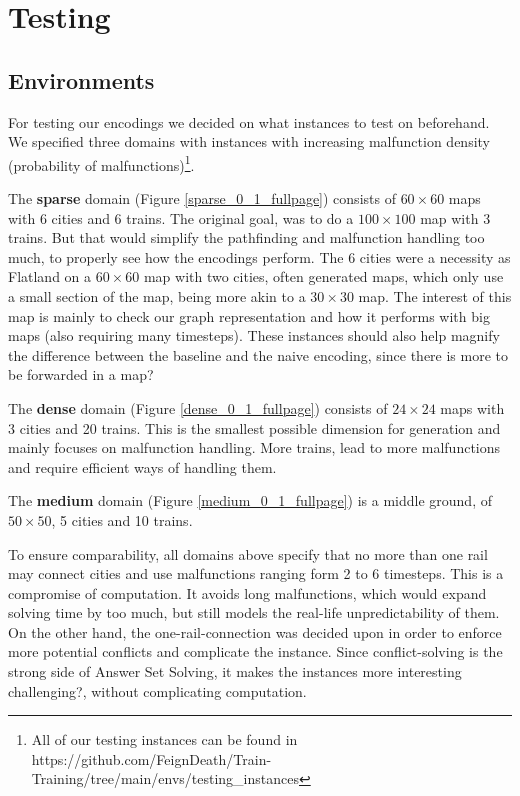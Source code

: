\section{Testing}
\subsection{Environments}
For testing our encodings we decided on what instances to test on beforehand. We specified three domains with instances with increasing malfunction density (probability of malfunctions)\footnote{All of our testing instances can be found in https://github.com/FeignDeath/Train-Training/tree/main/envs/testing\_instances}. 

The \textbf{sparse} domain (Figure \ref{sparse_0_1_fullpage}) consists of $60\times60$ maps with 6 cities and 6 trains. The original goal, was to do a $100\times100$ map with 3 trains. But that would simplify the pathfinding and malfunction handling too much, to properly see how the encodings perform. The 6 cities were a necessity as Flatland on a $60\times60$ map with two cities, often generated maps, which only use a small section of the map, being more akin to a $30\times30$ map. The interest of this map is mainly to check our graph representation and how it performs with big maps (also requiring many timesteps). 
\color{red}  These instances should also help magnify the difference between the baseline and the naive encoding, since there is more to be forwarded in a map? \color{black}

The \textbf{dense} domain (Figure \ref{dense_0_1_fullpage}) consists of $24\times24$ maps with 3 cities and 20 trains. This is the smallest possible dimension for generation and mainly focuses on malfunction handling. More trains, lead to more malfunctions and require efficient ways of handling them.

The \textbf{medium} domain (Figure \ref{medium_0_1_fullpage}) is a middle ground, of $50\times50$, 5 cities and 10 trains.

To ensure comparability, all domains above specify that no more than one rail may connect cities and use malfunctions ranging form 2 to 6 timesteps. This is a compromise of computation. It avoids long malfunctions, which would expand solving time by too much, but still models the real-life unpredictability of them. On the other hand, the one-rail-connection was decided upon in order to enforce more potential conflicts and complicate the instance. Since conflict-solving is the strong side of Answer Set Solving, it makes the instances more interesting \color{red}challenging?\color{black}, without complicating computation.

